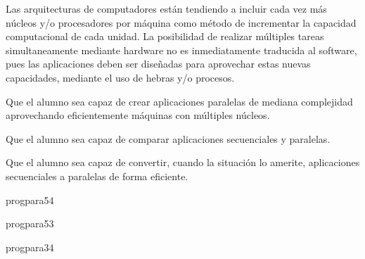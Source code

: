 \begin{syllabus}


\begin{justification}
Las arquitecturas de computadores están tendiendo a incluir cada vez más núcleos 
y/o procesadores por máquina como método de incrementar la capacidad computacional
de cada unidad. La posibilidad de realizar múltiples tareas simultaneamente mediante hardware 
no es inmediatamente traducida al software, pues las aplicaciones deben 
ser diseñadas para aprovechar estas nuevas capacidades, mediante el uso de hebras y/o procesos.
\end{justification}

\begin{goals}
\item Que el alumno sea capaz de crear aplicaciones paralelas de mediana complejidad aprovechando eficientemente máquinas con múltiples núcleos.
\item Que el alumno sea capaz de comparar aplicaciones secuenciales y paralelas.
\item Que el alumno sea capaz de convertir, cuando la situación lo amerite, aplicaciones secuenciales a paralelas de forma eficiente.
\end{goals}

\begin{outcomes}
\end{outcomes}

\begin{unit}{\CNParallelComputationDef}{progpara}{5}{4}
      \CNParallelComputationAllTopics %
      \CNParallelComputationAllObjectives
\end{unit}

\begin{unit}{\ARMultiprocessingDef}{progpara}{5}{3}
      \ARMultiprocessingAllTopics
      \ARMultiprocessingAllObjectives
\end{unit}

\begin{unit}{\ALParallelAlgorithmsDef}{progpara}{3}{4}
      \ALParallelAlgorithmsAllTopics %
      \ALParallelAlgorithmsAllObjectives
\end{unit}


\end{syllabus}
